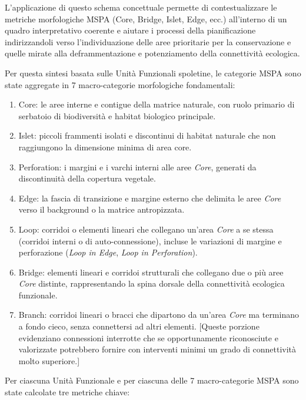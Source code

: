 \documentclass[
  a4paper,
]{book}
\providecommand{\tightlist}{%
  \setlength{\itemsep}{0pt}\setlength{\parskip}{0pt}}
\begin{document}
L'applicazione di questo schema concettuale permette di contestualizzare le metriche morfologiche MSPA (Core, Bridge, Islet, Edge, ecc.) all'interno di un quadro interpretativo coerente e aiutare i processi della pianificazione indirizzandoli verso l'individuazione delle aree prioritarie per la conservazione e quelle mirate alla deframmentazione e potenziamento della connettività ecologica.

Per questa sintesi basata sulle Unità Funzionali spoletine, le categorie MSPA sono state aggregate in 7 macro-categorie morfologiche fondamentali:

\begin{enumerate}
\def\labelenumi{\arabic{enumi}.}
\tightlist
\item
  Core: le aree interne e contigue della matrice naturale, con ruolo primario di serbatoio di biodiversità e habitat biologico principale.
\item
  Islet: piccoli frammenti isolati e discontinui di habitat naturale che non raggiungono la dimensione minima di area core.
\item
  Perforation: i margini e i varchi interni alle aree \emph{Core}, generati da discontinuità della copertura vegetale.
\item
  Edge: la fascia di transizione e margine esterno che delimita le aree \emph{Core} verso il background o la matrice antropizzata.
\item
  Loop: corridoi o elementi lineari che collegano un'area \emph{Core} a se stessa (corridoi interni o di auto-connessione), incluse le variazioni di margine e perforazione (\emph{Loop in Edge}, \emph{Loop in Perforation}).
\item
  Bridge: elementi lineari e corridoi strutturali che collegano due o più aree \emph{Core} distinte, rappresentando la spina dorsale della connettività ecologica funzionale.
\item
  Branch: corridoi lineari o bracci che dipartono da un'area \emph{Core} ma terminano a fondo cieco, senza connettersi ad altri elementi. {[}Queste porzione evidenziano connessioni interrotte che se opportunamente riconosciute e valorizzate potrebbero fornire con interventi minimi un grado di connettività molto superiore.{]}
\end{enumerate}

Per ciascuna Unità Funzionale e per ciascuna delle 7 macro-categorie MSPA sono state calcolate tre metriche chiave:
\end{document}
